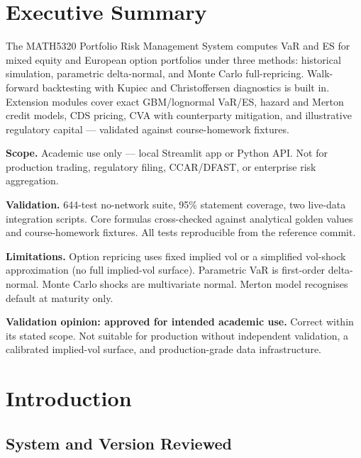 \documentclass[11pt]{article}
\begin{document}
\section{Executive Summary}

The MATH5320 Portfolio Risk Management System computes VaR and ES for
mixed equity and European option portfolios under three methods: historical
simulation, parametric delta-normal, and Monte Carlo full-repricing.
Walk-forward backtesting with Kupiec and Christoffersen diagnostics is
built in.  Extension modules cover exact GBM/lognormal VaR/ES, hazard
and Merton credit models, CDS pricing, CVA with counterparty mitigation,
and illustrative regulatory capital --- validated against course-homework
fixtures.

\textbf{Scope.}  Academic use only --- local Streamlit app or Python API.
Not for production trading, regulatory filing, CCAR/DFAST, or enterprise
risk aggregation.

\textbf{Validation.}  644-test no-network suite, 95\% statement coverage,
two live-data integration scripts.  Core formulas cross-checked against
analytical golden values and course-homework fixtures.  All tests
reproducible from the reference commit.

\textbf{Limitations.}  Option repricing uses fixed implied vol or a
simplified vol-shock approximation (no full implied-vol surface).
Parametric VaR is first-order delta-normal.  Monte Carlo shocks are
multivariate normal.  Merton model recognises default at maturity only.

\textbf{Validation opinion: approved for intended academic use.}
Correct within its stated scope.  Not suitable for production without
independent validation, a calibrated implied-vol surface, and
production-grade data infrastructure.

\section{Introduction}

\subsection{System and Version Reviewed}
\end{document}
